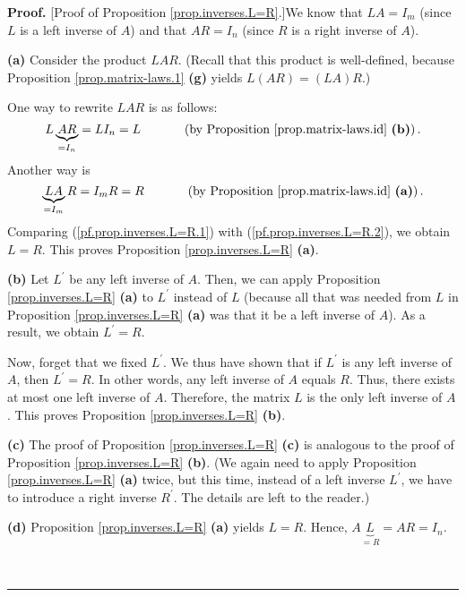 \documentclass[numbers=enddot,12pt,final,onecolumn,notitlepage]{scrartcl}%
\theoremstyle{definition}
\newenvironment{proof}[1][Proof]{\noindent\textbf{#1.} }{\ \rule{0.5em}{0.5em}}
\begin{document}
\begin{proof}
[Proof of Proposition \ref{prop.inverses.L=R}.]We know that $LA=I_{m}$ (since
$L$ is a left inverse of $A$) and that $AR=I_{n}$ (since $R$ is a right
inverse of $A$).

\textbf{(a)} Consider the product $LAR$. (Recall that this product is
well-defined, because Proposition \ref{prop.matrix-laws.1} \textbf{(g)} yields
$L\left(  AR\right)  =\left(  LA\right)  R$.)

One way to rewrite $LAR$ is as follows:%
\begin{equation}
L\underbrace{AR}_{=I_{n}}=LI_{n}=L\ \ \ \ \ \ \ \ \ \ \left(  \text{by
Proposition \ref{prop.matrix-laws.id} \textbf{(b)}}\right)  .
\label{pf.prop.inverses.L=R.1}%
\end{equation}
Another way is%
\begin{equation}
\underbrace{LA}_{=I_{m}}R=I_{m}R=R\ \ \ \ \ \ \ \ \ \ \left(  \text{by
Proposition \ref{prop.matrix-laws.id} \textbf{(a)}}\right)  .
\label{pf.prop.inverses.L=R.2}%
\end{equation}
Comparing (\ref{pf.prop.inverses.L=R.1}) with (\ref{pf.prop.inverses.L=R.2}),
we obtain $L=R$. This proves Proposition \ref{prop.inverses.L=R} \textbf{(a)}.

\textbf{(b)} Let $L^{\prime}$ be any left inverse of $A$. Then, we can apply
Proposition \ref{prop.inverses.L=R} \textbf{(a)} to $L^{\prime}$ instead of
$L$ (because all that was needed from $L$ in Proposition
\ref{prop.inverses.L=R} \textbf{(a)} was that it be a left inverse of $A$). As
a result, we obtain $L^{\prime}=R$.

Now, forget that we fixed $L^{\prime}$. We thus have shown that if $L^{\prime
}$ is any left inverse of $A$, then $L^{\prime}=R$. In other words, any left
inverse of $A$ equals $R$. Thus, there exists at most one left inverse of $A$.
Therefore, the matrix $L$ is the only left inverse of $A$. This proves
Proposition \ref{prop.inverses.L=R} \textbf{(b)}.

\textbf{(c)} The proof of Proposition \ref{prop.inverses.L=R} \textbf{(c)} is
analogous to the proof of Proposition \ref{prop.inverses.L=R} \textbf{(b)}.
(We again need to apply Proposition \ref{prop.inverses.L=R} \textbf{(a)}
twice, but this time, instead of a left inverse $L^{\prime}$, we have to
introduce a right inverse $R^{\prime}$. The details are left to the reader.)

\textbf{(d)} Proposition \ref{prop.inverses.L=R} \textbf{(a)} yields $L=R$.
Hence, $A\underbrace{L}_{=R}=AR=I_{n}$.


\end{proof}
\end{document}
